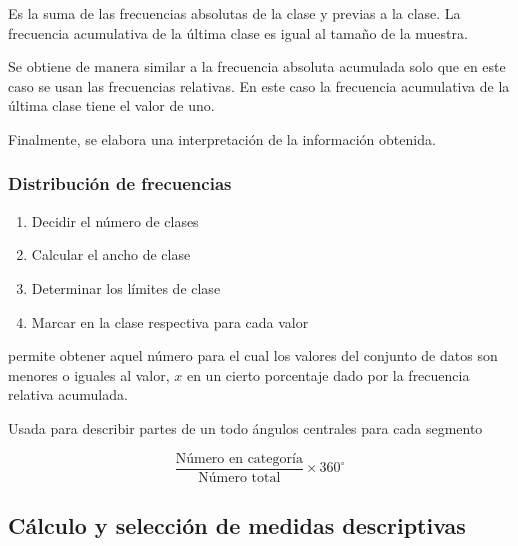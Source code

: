 \begin{definition}
    Es la suma de las frecuencias absolutas de la
    clase y previas a la clase. La frecuencia
    acumulativa de la última clase es igual al
    tamaño de la muestra.
\end{definition}

\begin{definition}
    Se obtiene de manera similar a la frecuencia
    absoluta acumulada solo que en este caso se
    usan las frecuencias relativas. En este caso la
    frecuencia acumulativa de la última clase tiene
    el valor de uno.
\end{definition}

Finalmente, se elabora una interpretación de la información obtenida.

\subsubsection{Distribución de frecuencias}

\begin{enumerate}
    \item Decidir el número de clases
    \item Calcular el ancho de clase
    \item Determinar los límites de clase
    \item Marcar en la clase respectiva para cada valor
\end{enumerate}


\begin{definition}[Ojiva]
    permite obtener aquel número para el cual los valores del conjunto de datos son menores o iguales al valor, $x$ en un cierto porcentaje dado por la frecuencia relativa acumulada.
\end{definition}

\begin{definition}
    Usada para describir partes de un todo ángulos centrales para cada segmento
\end{definition}
\begin{equation}
    \frac{\text{Número en categoría}}{\text{Número total}}\times360^{\circ}
\end{equation}

\subsection{Cálculo y selección de medidas descriptivas}

